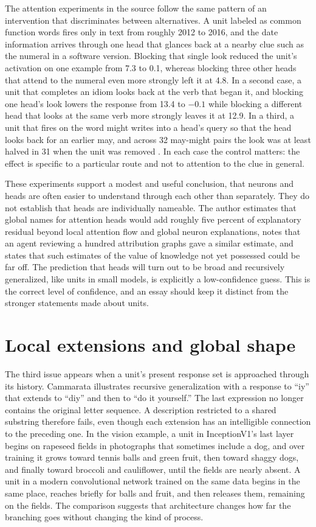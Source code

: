 \documentclass[11pt]{article}
\begin{document}
The attention experiments in the source follow the same pattern of an intervention that discriminates between alternatives. A unit labeled as common function words fires only in text from roughly 2012 to 2016, and the date information arrives through one head that glances back at a nearby clue such as the numeral in a software version. Blocking that single look reduced the unit's activation on one example from 7.3 to 0.1, whereas blocking three other heads that attend to the numeral even more strongly left it at 4.8. In a second case, a unit that completes an idiom looks back at the verb that began it, and blocking one head's look lowers the response from 13.4 to $-0.1$ while blocking a different head that looks at the same verb more strongly leaves it at 12.9. In a third, a unit that fires on the word might writes into a head's query so that the head looks back for an earlier may, and across 32 may-might pairs the look was at least halved in 31 when the unit was removed \cite[\emph{Attention}]{cammarata}. In each case the control matters: the effect is specific to a particular route and not to attention to the clue in general.

These experiments support a modest and useful conclusion, that neurons and heads are often easier to understand through each other than separately. They do not establish that heads are individually nameable. The author estimates that global names for attention heads would add roughly five percent of explanatory residual beyond local attention flow and global neuron explanations, notes that an agent reviewing a hundred attribution graphs gave a similar estimate, and states that such estimates of the value of knowledge not yet possessed could be far off. The prediction that heads will turn out to be broad and recursively generalized, like units in small models, is explicitly a low-confidence guess. This is the correct level of confidence, and an essay should keep it distinct from the stronger statements made about units.

\section{Local extensions and global shape}

The third issue appears when a unit's present response set is approached through its history. Cammarata illustrates recursive generalization with a response to ``iy'' that extends to ``diy'' and then to ``do it yourself.'' The last expression no longer contains the original letter sequence. A description restricted to a shared substring therefore fails, even though each extension has an intelligible connection to the preceding one. In the vision example, a unit in InceptionV1's last layer begins on rapeseed fields in photographs that sometimes include a dog, and over training it grows toward tennis balls and green fruit, then toward shaggy dogs, and finally toward broccoli and cauliflower, until the fields are nearly absent. A unit in a modern convolutional network trained on the same data begins in the same place, reaches briefly for balls and fruit, and then releases them, remaining on the fields. The comparison suggests that architecture changes how far the branching goes without changing the kind of process.
\end{document}

